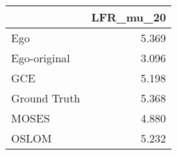 \begin{tabular}{lr}
\toprule
{} & LFR_mu_20 \\
\midrule
Ego          &     5.369 \\
Ego-original &     3.096 \\
GCE          &     5.198 \\
Ground Truth &     5.368 \\
MOSES        &     4.880 \\
OSLOM        &     5.232 \\
\bottomrule
\end{tabular}
